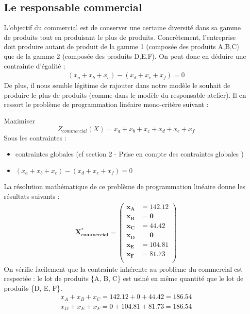 \documentclass[12pt]{article}
\begin{document}
\subsection{Le responsable commercial}
L'objectif du commercial est de conserver une certaine diversité dans sa gamme de produits tout en produisant le plus de produits. Concrètement, l'entreprise doit produire autant de produit de la gamme 1 (composée des produits A,B,C) que de la gamme 2 (composée des produits D,E,F).
On peut donc en déduire une contrainte d'égalité :
\begin{align*} 
(x_{a} + x_{b} + x_{c}) - (x_{d} + x_{e} + x_{f}) = 0
\end{align*}
De plus, il nous semble légitime de rajouter dans notre modèle le souhait de produire le plus de produits (comme dans le modèle du responsable atelier).
Il en ressort le problème de programmation linéaire mono-critère suivant :
\begin{tcolorbox}
Maximiser
\begin{equation*}
 Z_{commercial}(X)=x_{a} + x_{b} + x_{c} + x_{d} + x_{e} + x_{f}
\end{equation*}
Sous les contraintes :
\begin{itemize}
\item contraintes globales (cf section 2 - Prise en compte des contraintes globales )
\item $(x_{a} + x_{b} + x_{c}) - (x_{d} + x_{e} + x_{f}) = 0$
\end{itemize}
\end{tcolorbox}
La résolution mathématique de ce problème de programmation linéaire donne les résultats suivants :
\begin{align*}
\boldsymbol{X^{*}_{commercial} = 
   \left (
   \begin{aligned}
      x_{A} &= 142.12 \\
      x_{B} &= 0 \\
      x_{C} &= 44.42 \\
      x_{D} &= 0 \\
      x_{E} &= 104.81 \\
      x_{F} &= 81.73 \\
   \end{aligned}
   \right )
 } 
\end{align*}
On vérifie facilement que la contrainte inhérente au problème du commercial est respectée : le lot de produits \{A, B, C\} est usiné en même quantité que le lot de produits \{D, E, F\}. 
\begin{align*}
x_{A} + x_{B} + x_{C} = 142.12 + 0 + 44.42 = 186.54 \\
x_{D} + x_{E} + x_{F} = 0 + 104.81 + 81.73 = 186.54
\end{align*}
\end{document}
